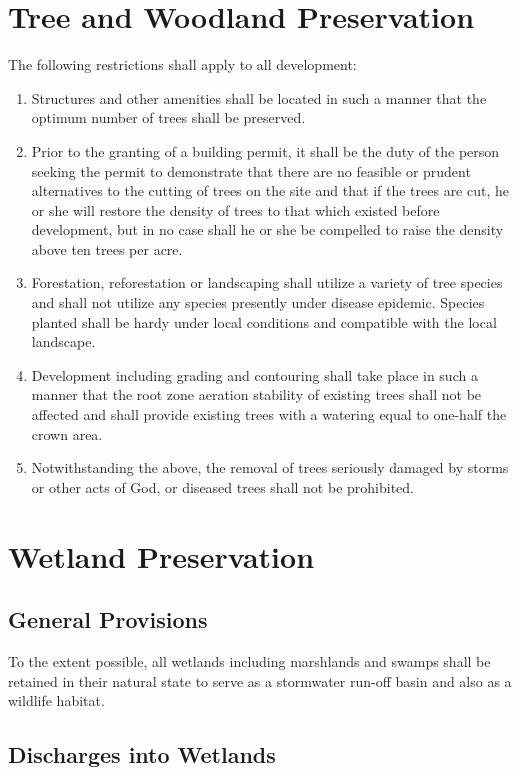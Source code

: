 \section{Tree and Woodland Preservation}
The following restrictions shall apply to all development:
\begin{enumerate}[{\indent}A)]
    \item Structures and other amenities shall be located in such a manner that the optimum number of trees shall be preserved.
    \item Prior to the granting of a building permit, it shall be the duty of the person seeking the permit to demonstrate that there are no feasible or prudent alternatives to the cutting of trees on the site and that if the trees are cut, he or she will restore the density of trees to that which existed before development, but in no case shall he or she be compelled to raise the density above ten trees per acre.
    \item Forestation, reforestation or landscaping shall utilize a variety of tree species and shall not utilize any species presently under disease epidemic. Species planted shall be hardy under local conditions and compatible with the local landscape.
    \item Development including grading and contouring shall take place in such a manner that the root zone aeration stability of existing trees shall not be affected and shall provide existing trees with a watering equal to one-half the crown area.
    \item Notwithstanding the above, the removal of trees seriously damaged by storms or other acts of God, or diseased trees shall not be prohibited.
\end{enumerate}

\section{Wetland Preservation}
\subsection{General Provisions}
To the extent possible, all wetlands including marshlands and swamps shall be retained in their natural state to serve as a stormwater run-off basin and also as a wildlife habitat.
\subsection{Discharges into Wetlands}
